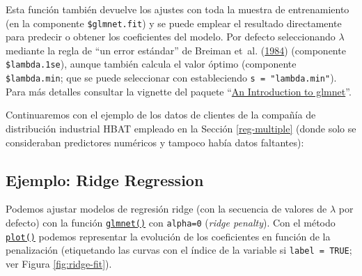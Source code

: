 \documentclass[
]{book}
\newenvironment{Shaded}{\begin{snugshade}}{\end{snugshade}}
\newcommand{\DecValTok}[1]{\textcolor[rgb]{0.00,0.00,0.81}{#1}}
\newcommand{\FloatTok}[1]{\textcolor[rgb]{0.00,0.00,0.81}{#1}}
\newcommand{\FunctionTok}[1]{\textcolor[rgb]{0.00,0.00,0.00}{#1}}
\newcommand{\NormalTok}[1]{#1}
\newcommand{\OtherTok}[1]{\textcolor[rgb]{0.56,0.35,0.01}{#1}}
\newcommand{\SpecialCharTok}[1]{\textcolor[rgb]{0.00,0.00,0.00}{#1}}
\newcommand{\StringTok}[1]{\textcolor[rgb]{0.31,0.60,0.02}{#1}}
\theoremstyle{break}
\theoremstyle{nonumberplain}
\begin{document}
Esta función también devuelve los ajustes con toda la muestra de entrenamiento (en la componente \texttt{\$glmnet.fit}) y se puede emplear el resultado directamente para predecir o obtener los coeficientes del modelo.
Por defecto seleccionando \(\lambda\) mediante la regla de ``un error estándar'' de Breiman et~al. (\protect\hyperlink{ref-breiman1984classification}{1984}) (componente \texttt{\$lambda.1se}), aunque también calcula el valor óptimo (componente \texttt{\$lambda.min}; que se puede seleccionar con estableciendo \texttt{s\ =\ "lambda.min"}).
Para más detalles consultar la vignette del paquete ``\href{https://glmnet.stanford.edu/articles/glmnet.html}{An Introduction to glmnet}''.

Continuaremos con el ejemplo de los datos de clientes de la compañía de distribución industrial HBAT empleado en la Sección \ref{reg-multiple} (donde solo se consideraban predictores numéricos y tampoco había datos faltantes):

\begin{Shaded}
\end{Shaded}

\hypertarget{ejemplo-ridge-regression}{%
\subsection{Ejemplo: Ridge Regression}\label{ejemplo-ridge-regression}}

Podemos ajustar modelos de regresión ridge (con la secuencia de valores de \(\lambda\) por defecto) con la función \href{https://glmnet.stanford.edu/reference/glmnet.html}{\texttt{glmnet()}} con \texttt{alpha=0} (\emph{ridge penalty}).
Con el método \href{https://glmnet.stanford.edu/reference/plot.glmnet.html}{\texttt{plot()}} podemos representar la evolución de los coeficientes en función de la penalización (etiquetando las curvas con el índice de la variable si \texttt{label\ =\ TRUE}; ver Figura \ref{fig:ridge-fit}).
\end{document}
